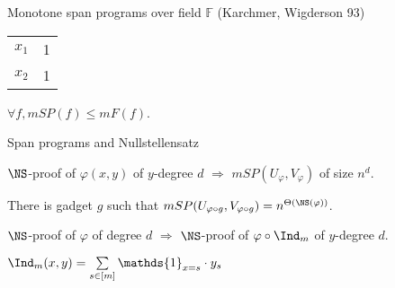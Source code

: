 \begin{frame}{Monotone span programs over field $\mathbb{F}$ (Karchmer, Wigderson 93)}
\begin{minipage}{0.5\linewidth}
\begin{center}
            \begin{tabular}{|c|c|}
                \hline
                $x_1$ & 1\\
                $x_2$ & 1\\
                \hline
            \end{tabular}
        \end{center}
    \end{minipage}

    \pause
    \begin{lemma}
        $\forall f, mSP(f) \le mF(f)$.
    \end{lemma}
\end{frame}


\begin{frame}{Span programs and Nullstellensatz}

    \begin{lemma}
        $\NS$-proof of $\varphi(x, y)$ of $y$-degree $d$ $\Rightarrow$ $mSP(U_{\varphi}, V_{\varphi})$ of
        size $n^d$.
    \end{lemma}

    \pause

    \begin{lemma}
        There is gadget $g$ such that $mSP(U_{\varphi \circ g}, V_{\varphi \circ g}) =
        n^{\Theta(\NS(\varphi))}$.
    \end{lemma}

    \pause

    \begin{lemma}
        $\NS$-proof of $\varphi$ of degree $d$ $\Rightarrow$ $\NS$-proof of $\varphi \circ \Ind_m$ of
        $y$-degree $d$.
    \end{lemma}

    $\Ind_m(x, y) = \sum\limits_{s \in [m]} \mathds{1}_{x = s} \cdot y_s$
\end{frame}


